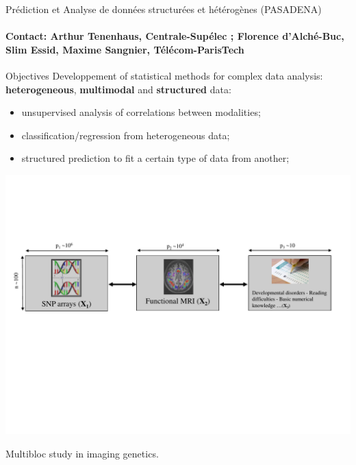 \begin{frame}{Prédiction et Analyse de données structurées et hétérogènes (PASADENA) }
\framesubtitle{Contact: Arthur Tenenhaus, Centrale-Supélec ; Florence d’Alché-Buc, Slim Essid,  Maxime Sangnier, Télécom-ParisTech}

\begin{alertblock}{Objectives}
Developpement of statistical methods for complex data analysis: \textbf{heterogeneous}, \textbf{multimodal} and \textbf{structured} data:
\begin{itemize}
\item unsupervised analysis of correlations between modalities;
\item classification/regression from heterogeneous data;
\item structured prediction to fit a certain type of data from another;
\end{itemize}
\end{alertblock}


\begin{minipage}[c]{.7\linewidth}
\includegraphics[trim = 0mm 90mm 0mm 50mm, clip, width=\linewidth]{Images/pasadena_poster_I.pdf}
\end{minipage}\hfill
\begin{minipage}[c]{.28\linewidth}
Multibloc study in imaging genetics.
\end{minipage}


\end{frame}




